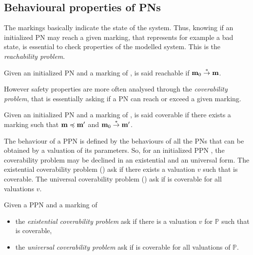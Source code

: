 \subsection{Behavioural properties of \aclp{PN}}

The markings basically indicate the state of the system. Thus, knowing if an initialized \ac{PN} may reach a given marking, that represents for example a bad state, is essential to check properties of the modelled system. This is the \emph{reachability problem}.

\begin{defi}[Reachability]
  Given an initialized \ac{PN} \NPTm and a marking \marq of \tupleN, \marq is said reachable if $\mathbf{m}_0 \stackrel{*}{\to} \mathbf{m}$.
\end{defi}

However safety properties are more often analysed through the \emph{coverability problem}, that is essentially asking if a \ac{PN} can reach or exceed a given marking.

\begin{defi}[Coverability]
  Given an initialized \ac{PN} \NPTm and a marking \marq of \tupleN, \marq is said coverable if there exists a marking \marqp such that $\mathbf{m} \preccurlyeq \mathbf{m'}$ and $\mathbf{m}_0 \stackrel{*}{\to} \mathbf{m'}$.
\end{defi}

The behaviour of a \ac{PPN} is defined by the behaviours of all the \acp{PN} that can be obtained by a valuation of its parameters.
So, for an initialized \ac{PPN} \tupleS, the coverability problem may be declined in an existential and an universal form.
The existential coverability problem (\Ecov) ask if there exists a valuation $v$ such that \marq is coverable.
The universal coverability problem (\Ucov) ask if \marq is coverable for all valuations $v$.

\begin{defi}
  Given a \ac{PPN} \SPTP and a marking \marq of \tupleS
  \begin{itemize}
    \item the \emph{existential coverability problem} ask if there is a valuation $v$ for $\mathbb{P}$ such that \marq is coverable,
    \item the \emph{universal   coverability problem} ask if \marq is coverable for all valuations of $\mathbb{P}$.
  \end{itemize}
\end{defi}


